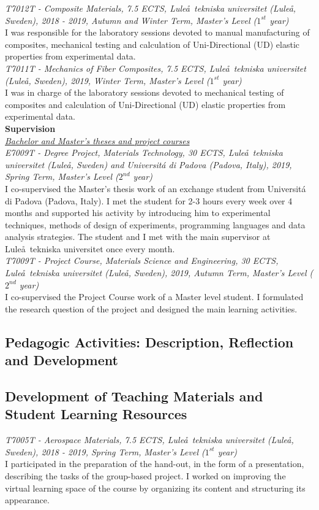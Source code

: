 \documentclass[
  a4paper, 
]{fortysecondscv}
\begin{document}
\textit{T7012T - Composite Materials, 7.5 ECTS, Lule\aa\ tekniska universitet (Lule\aa, Sweden), 2018 - 2019, Autumn and Winter Term, Master's Level ($1^{st}$ year)}\\
I was responsible for the laboratory sessions devoted to manual manufacturing of composites, mechanical testing and calculation of Uni-Directional (UD) elastic properties from experimental data.\\[6pt]
\textit{T7011T - Mechanics of Fiber Composites, 7.5 ECTS, Lule\aa\ tekniska universitet (Lule\aa, Sweden), 2019, Winter Term, Master's Level ($1^{st}$ year)}\\
I was in charge of the laboratory sessions devoted to mechanical testing of composites and calculation of Uni-Directional (UD) elastic properties from experimental data.\\[6pt]
\textbf{Supervision}\\[6pt]
\underline{\emph{Bachelor and Master's theses and project courses}}\\[6pt]
\textit{E7009T - Degree Project, Materials Technology, 30 ECTS, Lule\aa\ tekniska universitet (Lule\aa, Sweden) and Universit\'a di Padova (Padova, Italy), 2019, Spring Term, Master's Level ($2^{nd}$ year)}\\
I co-supervised the Master's thesis work of an exchange student from Universit\'a di Padova (Padova, Italy). I met the student for 2-3 hours every week over 4 months and supported his activity by introducing him to experimental techniques, methods of design of experiments, programming languages and data analysis strategies. The student and I met with the main supervisor at Lule\aa\ tekniska universitet once every month.\\[6pt]
\textit{T7009T - Project Course, Materials Science and Engineering, 30 ECTS, Lule\aa\ tekniska universitet (Lule\aa, Sweden), 2019, Autumn Term, Master's Level ($2^{nd}$ year)}\\
I co-supervised the Project Course work of a Master level student. I formulated the research question of the project and designed the main learning activities.\\

\subsection{Pedagogic Activities: Description, Reflection and Development}

\subsection{Development of Teaching Materials and Student Learning Resources}
\textit{T7005T - Aerospace Materials, 7.5 ECTS, Lule\aa\ tekniska universitet (Lule\aa, Sweden), 2018 - 2019, Spring Term, Master's Level ($1^{st}$ year)}\\
I participated in the preparation of the hand-out, in the form of a presentation, describing the tasks of the group-based project. I worked on improving the virtual learning space of the course by organizing its content and structuring its appearance.
\end{document}
